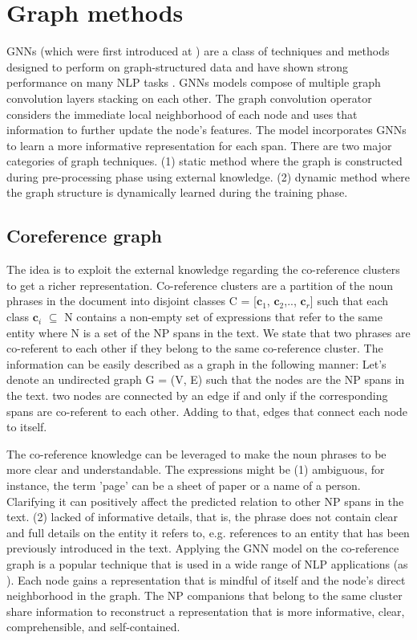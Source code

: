 \documentclass[11pt, a4paper, twocolumn]{article}
\begin{document}
\section{Graph methods}
\label{graphmethods}

GNNs (which were first introduced at \cite{gnn}) are a class of techniques and methods designed to perform on graph-structured data and have shown strong performance on many NLP tasks \cite{gnnfonlp}. GNNs models compose of multiple graph convolution layers stacking on each other. The graph convolution operator considers the immediate local neighborhood of each node and uses that information to further update the node's features.
The model incorporates GNNs to learn a more informative representation for each span.
There are two major categories of graph techniques. 
(1) static method where the graph is constructed during pre-processing phase using external knowledge.
(2) dynamic method where the graph structure is dynamically learned during the training phase.

\subsection{Coreference graph}
\label{coreferencegraph}

The idea is to exploit the external knowledge regarding the co-reference clusters to get a richer representation.
Co-reference clusters are a partition of the noun phrases in the document into disjoint classes C = [$\mathbf{c}_1$, $\mathbf{c}_2$,.., $\mathbf{c}_r$]
such that each class $\mathbf{c}_i$  $\mathbf{\subseteq}$ N contains a non-empty set of expressions that refer to the same entity where N is a set of the NP spans in the text. We state that two phrases are co-referent to each other if they belong to the same co-reference cluster.
The information can be easily described as a graph in the following manner:
Let's denote an undirected graph G = (V, E) such that the nodes are the NP spans in the text. two nodes are connected by an edge if and only if the corresponding spans are co-referent to each other. Adding to that, edges that connect each node to itself.

The co-reference knowledge can be leveraged to make the noun phrases to be more clear and understandable. The expressions might be (1) ambiguous, for instance, the term 'page' can be a sheet of paper or a name of a person. Clarifying it can positively affect the predicted relation to other NP spans in the text.
(2) lacked of informative details, that is, the phrase does not contain clear and full details on the entity it refers to, e.g. references to an entity that has been previously introduced in the text. 
Applying the GNN model on the co-reference graph is a popular technique that is used in a wide range of NLP applications (as \cite{corefsummarizartion} \cite{entitymentions}). Each node gains a representation that is mindful of itself and the node's direct neighborhood in the graph.
The NP companions that belong to the same cluster share information to reconstruct a representation that is more informative, clear, comprehensible, and self-contained.
\end{document}
